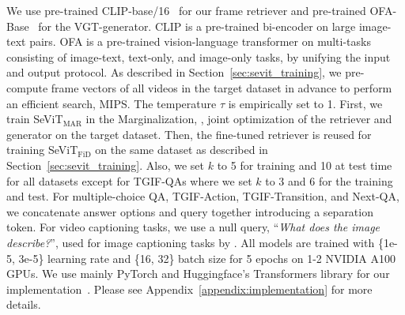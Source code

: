 \documentclass{article}
\newcommand{\frameworkname}{SeViT}
\begin{document}
We use pre-trained CLIP-base/16~\cite{radford2021learning} for our frame retriever and pre-trained OFA-Base~\cite{wang2022unifying} for the VGT-generator. CLIP is a pre-trained bi-encoder on large image-text pairs. OFA is a pre-trained vision-language transformer on multi-tasks consisting of image-text, text-only, and image-only tasks, by unifying the input and output protocol. As described in Section~\ref{sec:sevit_training}, we pre-compute frame vectors of all videos in the target dataset in advance to perform an efficient search, MIPS. The temperature $\tau$ is empirically set to 1. First, we train \frameworkname{}$_\text{MAR}$ in the Marginalization, \ie, joint optimization of the retriever and generator on the target dataset. Then, the fine-tuned retriever is reused for training \frameworkname{}$_\text{FiD}$ on the same dataset as described in Section~\ref{sec:sevit_training}. Also, we set $k$ to 5 for training and 10 at test time for all datasets except for TGIF-QAs where we set $k$ to 3 and 6 for the training and test.
For multiple-choice QA, TGIF-Action, TGIF-Transition, and Next-QA, we concatenate answer options and query together introducing a separation token. For video captioning tasks, we use a null query, ``\textit{What does the image describe?}'', used for image captioning tasks by \citet{wang2022unifying}. All models are trained with \{1e-5, 3e-5\} learning rate and \{16, 32\} batch size for 5 epochs on 1-2 NVIDIA A100 GPUs. We use mainly PyTorch and Huggingface's Transformers library for our implementation~\cite{paszke2019pytorch, wolf2020transformers}. Please see Appendix~\ref{appendix:implementation} for more details.
\end{document}
